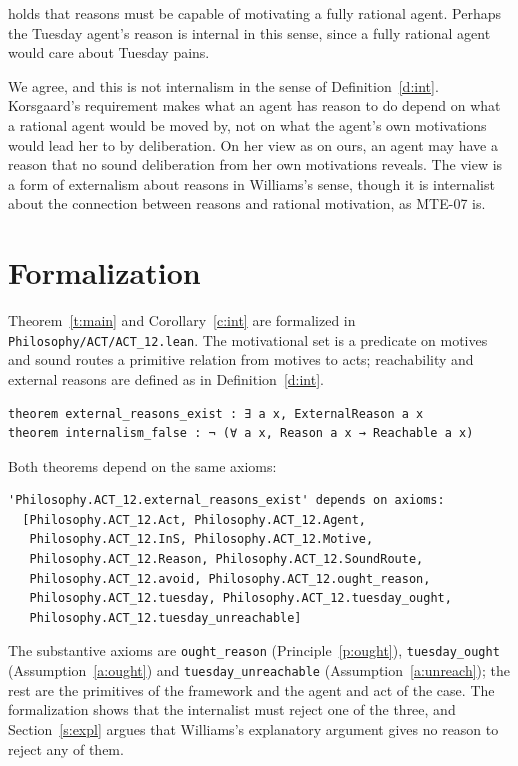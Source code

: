 \documentclass{situationist-preprint}
\begin{document}
\begin{objection}
\citet{Korsgaard1986} holds that reasons must be capable of motivating a fully rational agent. Perhaps the Tuesday agent's reason is internal in this sense, since a fully rational agent would care about Tuesday pains.
\end{objection}

\begin{reply}
We agree, and this is not internalism in the sense of Definition~\ref{d:int}. Korsgaard's requirement makes what an agent has reason to do depend on what a rational agent would be moved by, not on what the agent's own motivations would lead her to by deliberation. On her view as on ours, an agent may have a reason that no sound deliberation from her own motivations reveals. The view is a form of externalism about reasons in Williams's sense, though it is internalist about the connection between reasons and rational motivation, as MTE-07 is.
\end{reply}

\section{Formalization}

Theorem~\ref{t:main} and Corollary~\ref{c:int} are formalized in \nolinkurl{Philosophy/ACT/ACT_12.lean}. The motivational set is a predicate on motives and sound routes a primitive relation from motives to acts; reachability and external reasons are defined as in Definition~\ref{d:int}.

\begin{lstlisting}
theorem external_reasons_exist : ∃ a x, ExternalReason a x
theorem internalism_false : ¬ (∀ a x, Reason a x → Reachable a x)
\end{lstlisting}

Both theorems depend on the same axioms:

\begin{lstlisting}
'Philosophy.ACT_12.external_reasons_exist' depends on axioms:
  [Philosophy.ACT_12.Act, Philosophy.ACT_12.Agent,
   Philosophy.ACT_12.InS, Philosophy.ACT_12.Motive,
   Philosophy.ACT_12.Reason, Philosophy.ACT_12.SoundRoute,
   Philosophy.ACT_12.avoid, Philosophy.ACT_12.ought_reason,
   Philosophy.ACT_12.tuesday, Philosophy.ACT_12.tuesday_ought,
   Philosophy.ACT_12.tuesday_unreachable]
\end{lstlisting}

The substantive axioms are \texttt{ought\_reason} (Principle~\ref{p:ought}), \texttt{tuesday\_ought} (Assumption~\ref{a:ought}) and \texttt{tuesday\_unreachable} (Assumption~\ref{a:unreach}); the rest are the primitives of the framework and the agent and act of the case. The formalization shows that the internalist must reject one of the three, and Section~\ref{s:expl} argues that Williams's explanatory argument gives no reason to reject any of them.
\end{document}
